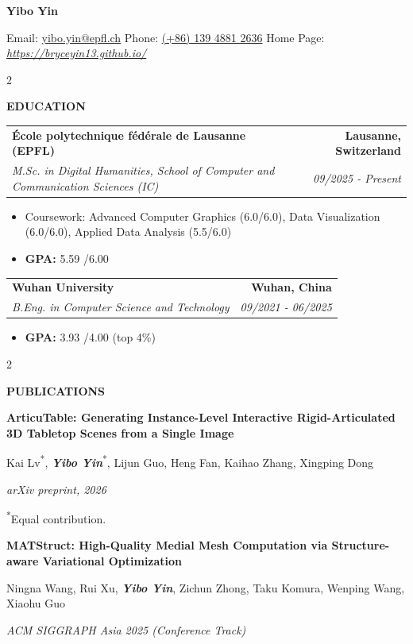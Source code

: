 \documentclass[10pt, letterpaper]{article}
\makeatletter
\newcommand{\sectionlabel}[1]{%
  {\fontsize{9.5pt}{11pt}\selectfont\bfseries\MakeUppercase{#1}}%
}
\newenvironment{cvsection}[1]{%
  \par\vspace{0.86\baselineskip}%
  \Needspace{3\baselineskip}%
  \setcolumnwidth{1.10in,\fill}%
  \begin{paracol}{2}%
  \raggedright\sectionlabel{#1}%
  \switchcolumn
}{%
  \end{paracol}%
}
\newcommand{\educationentry}[4]{%
  \noindent\begin{tabularx}{\linewidth}{@{}Xr@{}}
    \textbf{#1} & \textbf{#2} \\
    \textit{#3} & \textit{\small #4}
  \end{tabularx}%
}
\makeatother
\begin{document}
\begin{center}
  {\fontsize{24pt}{27pt}\selectfont\bfseries Yibo Yin}

  \vspace{0.58em}
  Email: \href{mailto:yibo.yin@epfl.ch}{yibo.yin@epfl.ch}
  \quad\textbullet\quad
  Phone: \href{tel:+8613948812636}{(+86) 139 4881 2636}
  \quad\textbullet\quad
  Home Page: \href{https://bryceyin13.github.io/}{\textit{https://bryceyin13.github.io/}}
\end{center}

\vspace{-0.15\baselineskip}

\begin{cvsection}{Education}
\educationentry{École polytechnique fédérale de Lausanne (EPFL)}
  {Lausanne, Switzerland}
  {M.Sc. in Digital Humanities, School of Computer and Communication Sciences (IC)}
  {09/2025 - Present}
\begin{itemize}
  \item Coursework: Advanced Computer Graphics (6.0/6.0), Data Visualization (6.0/6.0), Applied Data Analysis (5.5/6.0)
  \item \textbf{GPA:} 5.59 /6.00
\end{itemize}

\vspace{0.56\baselineskip}
\educationentry{Wuhan University}
  {Wuhan, China}
  {B.Eng. in Computer Science and Technology}
  {09/2021 - 06/2025}
\begin{itemize}
  \item \textbf{GPA:} 3.93 /4.00 (top 4\%)
\end{itemize}
\end{cvsection}

\begin{cvsection}{Publications}
\textbf{ArticuTable: Generating Instance-Level Interactive Rigid-Articulated 3D Tabletop Scenes from a Single Image}

Kai Lv\textsuperscript{*}, \textbf{\textit{Yibo Yin}}\textsuperscript{*}, Lijun Guo, Heng Fan, Kaihao Zhang, Xingping Dong

\textit{arXiv preprint, 2026}

{\small \textsuperscript{*}Equal contribution.}

\vspace{0.58\baselineskip}
\textbf{MATStruct: High-Quality Medial Mesh Computation via Structure-aware Variational Optimization}

Ningna Wang, Rui Xu, \textbf{\textit{Yibo Yin}}, Zichun Zhong, Taku Komura, Wenping Wang, Xiaohu Guo

\textit{ACM SIGGRAPH Asia 2025 (Conference Track)}
\end{cvsection}
\end{document}
